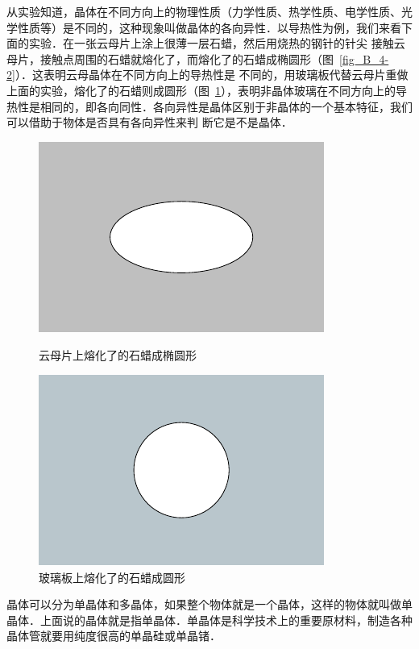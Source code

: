 从实验知道，晶体在不同方向上的物理性质（力学性质、热学性质、电学性质、光学性质等）是不同的，这种现象叫做晶体的各向异性．以导热性为例，我们来看下面的实验．在一张云母片上涂上很薄一层石蜡，然后用烧热的钢针的针尖
接触云母片，接触点周围的石蜡就熔化了，而熔化了的石蜡成椭圆形（图~\ref{fig_B_4-2}）．这表明云母晶体在不同方向上的导热性是
不同的，用玻璃板代替云母片重做上面的实验，熔化了的石蜡则成圆形（图~\ref{fig_B_4-3}），表明非晶体玻璃在不同方向上的导热性是相同的，即各向同性．各向异性是晶体区别于非晶体的一个基本特征，我们可以借助于物体是否具有各向异性来判
断它是不是晶体．

\begin{figure}[htbp]
    \centering
    \begin{minipage}{0.47\linewidth}
    	\centering
    	\includegraphics{fig/B/4-2.pdf}
    	\caption{云母片上熔化了的石蜡成椭圆形}\label{fig_B_4-2}
    \end{minipage}
    \hfill
    \begin{minipage}{0.47\linewidth}
    	\centering
    	\includegraphics{fig/B/4-3.pdf}
    	\caption{玻璃板上熔化了的石蜡成圆形}\label{fig_B_4-3}
    \end{minipage}
\end{figure}


晶体可以分为单晶体和多晶体，如果整个物体就是一个晶体，这样的物体就叫做单晶体．上面说的晶体就是指单晶体．单晶体是科学技术上的重要原材料，制造各种晶体管就要用纯度很高的单晶硅或单晶锗．

